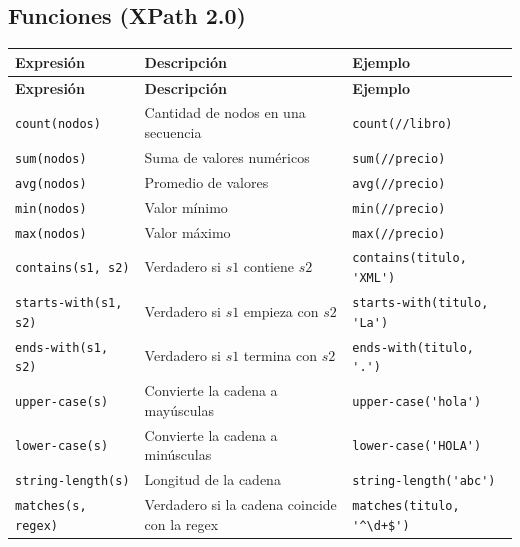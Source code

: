 \documentclass[a4paper, 8pt]{extarticle}
\begin{document}
\subsection*{Funciones (XPath 2.0)}

\begin{longtable}{@{} p{4cm} p{7cm} p{6.5cm} @{}}
\toprule
\textbf{Expresión} & \textbf{Descripción} & \textbf{Ejemplo} \\
\midrule
\endfirsthead
\toprule
\textbf{Expresión} & \textbf{Descripción} & \textbf{Ejemplo} \\
\midrule
\endhead
\bottomrule
\endfoot
\bottomrule
\endlastfoot

\centering \verb!count(nodos)!        & Cantidad de nodos en una secuencia           & \verb!count(//libro)!            \\
\centering \verb!sum(nodos)!          & Suma de valores numéricos                    & \verb!sum(//precio)!             \\
\centering \verb!avg(nodos)!          & Promedio de valores                          & \verb!avg(//precio)!             \\
\centering \verb!min(nodos)!          & Valor mínimo                                 & \verb!min(//precio)!             \\
\centering \verb!max(nodos)!          & Valor máximo                                 & \verb!max(//precio)!             \\
\centering \verb!contains(s1, s2)!    & Verdadero si $s1$ contiene $s2$              & \verb!contains(titulo, 'XML')!   \\
\centering \verb!starts-with(s1, s2)! & Verdadero si $s1$ empieza con $s2$           & \verb!starts-with(titulo, 'La')! \\
\centering \verb!ends-with(s1, s2)!   & Verdadero si $s1$ termina con $s2$           & \verb!ends-with(titulo, '.')!    \\
\centering \verb!upper-case(s)!       & Convierte la cadena a mayúsculas             & \verb!upper-case('hola')!        \\
\centering \verb!lower-case(s)!       & Convierte la cadena a minúsculas             & \verb!lower-case('HOLA')!        \\
\centering \verb!string-length(s)!    & Longitud de la cadena                        & \verb!string-length('abc')!      \\
\centering \verb!matches(s, regex)!   & Verdadero si la cadena coincide con la regex & \verb!matches(titulo, '^\d+$')!  \\
\end{longtable}
\end{document}
